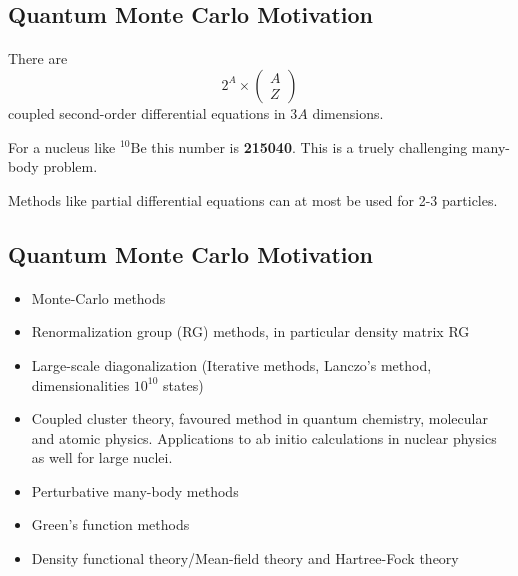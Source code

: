 \documentclass[%
twoside,                 %
final,                   %
10pt]{article}
\begin{document}
\subsection*{Quantum Monte Carlo Motivation}

\paragraph{}
There are
\[
 2^A\times \left(\begin{array}{c} A\\ Z\end{array}\right)
\]
coupled second-order differential equations in $3A$ dimensions.

For a nucleus like ${}^{10}\mbox{Be}$ this number is \textbf{215040}.
This is a truely challenging many-body problem.

Methods like partial differential equations can at most be used for 2-3 particles.




\subsection*{Quantum Monte Carlo Motivation}

\paragraph{}
\begin{itemize}
\item Monte-Carlo methods

\item Renormalization group (RG) methods, in particular density matrix RG

\item Large-scale diagonalization (Iterative methods, Lanczo's method, dimensionalities  $10^{10}$ states)

\item Coupled cluster theory, favoured method in quantum chemistry, molecular and atomic physics. Applications to ab initio calculations in nuclear physics as well for large nuclei.

\item Perturbative many-body methods 

\item Green's function methods

\item Density functional theory/Mean-field theory and Hartree-Fock theory
\end{itemize}
\end{document}
